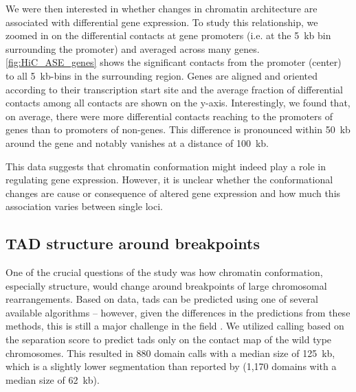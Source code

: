
We were then interested in whether changes in chromatin architecture are
associated with differential gene expression.
To study this relationship, we zoomed in on the differential \hic contacts at
gene promoters (i.e. at the 5~kb bin surrounding the promoter) and averaged
across many genes. \cref{fig:HiC_ASE_genes} shows the significant contacts from
the promoter (center) to all 5~kb-bins in the surrounding region. Genes are
aligned and oriented according to their transcription start site
and the average fraction of differential contacts among
all contacts are shown on the y-axis. Interestingly, we found that, on average,
there were more differential \hic contacts reaching to the promoters of
\ase genes than to promoters of non-\ase genes. This difference is pronounced
within 50~kb around the gene and notably vanishes at a distance of 100~kb.

This data suggests that chromatin conformation might indeed play a role in
regulating gene expression. However, it is unclear whether the conformational
changes are cause or consequence of altered gene expression and how much this
association varies between single loci.






\subsection{TAD structure around breakpoints}
\label{sec:balancer_tads_at_bp}

One of the crucial questions of the study was how chromatin conformation,
especially \tad structure, would change around breakpoints of large chromosomal
rearrangements. Based on \hic data, \acp{tad} can be predicted using one of
several available algorithms – however, given the differences in the predictions
from these methods, this is still a major challenge in the field
\citep[notably figure 3]{Forcato2017}. We utilized \tad calling based on the
\tad separation score \citep{Ramirez2018} to predict \acp{tad} only on the
contact map of the wild type chromosomes. This resulted in 880 domain calls with
a median size of 125~kb, which is a slightly lower segmentation than reported by
\citet{Sexton2012} (1,170 domains with a median size of 62~kb).

